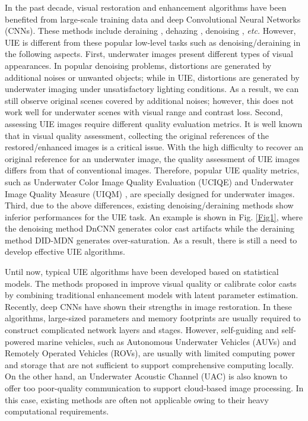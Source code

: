 \documentclass[journal]{IEEEtran}
\begin{document}
In the past decade, visual restoration and enhancement algorithms have been benefited from large-scale training data and deep Convolutional Neural Networks (CNNs). These methods include deraining \cite{DID-MDN,zhang2019image,wang2020deep}, dehazing \cite{dehazeli2018single,liuICCV2019GridDehazeNet,yang2019single}, denoising \cite{zhang2017beyond}, \textit{etc.} 
However, UIE is different from these popular low-level tasks such as denoising/deraining in the following aspects. First, underwater images present different types of visual appearances. In popular denoising problems, distortions are generated by additional noises or unwanted objects; while in UIE, distortions are generated by underwater imaging under unsatisfactory lighting conditions. As a result, we can still observe original scenes covered by additional noises; however, this does not work well for underwater scenes with visual range and contrast loss. Second, assessing UIE images require different quality evaluation metrics. It is well known that in visual quality assessment, collecting the original references of the restored/enhanced images is a critical issue. With the high difficulty to recover an original reference for an underwater image, the quality assessment of UIE images differs from that of conventional images. Therefore, popular UIE quality metrics, such as Underwater Color Image Quality Evaluation (UCIQE) \cite{yang2015underwater} and Underwater Image Quality Measure (UIQM) \cite{panetta2015human}, are specially designed for underwater images. Third, due to the above differences, existing denoising/deraining methods show inferior performances for the UIE task. An example is shown in Fig. \ref{Fig1}, where the denoising method DnCNN \cite{zhang2017beyond} generates color cast artifacts while the deraining method DID-MDN \cite{DID-MDN} generates over-saturation. As a result, there is still a need to develop effective UIE algorithms.

Until now, typical UIE algorithms have been developed based on statistical models. The methods proposed in \cite{carlevaris2010initial,chiang2011underwater,Wen2013Single} improve visual quality or calibrate color casts by combining traditional enhancement models with latent parameter estimation. Recently, deep CNNs have shown their strengths in image restoration. In these algorithms, large-sized parameters and memory footprints are usually required to construct complicated network layers and stages. However, self-guiding and self-powered marine vehicles, such as Autonomous Underwater Vehicles (AUVs) and Remotely Operated Vehicles (ROVs), are usually with limited computing power and storage that are not sufficient to support comprehensive computing locally. On the other hand, an Underwater Acoustic Channel (UAC) is also known to offer too poor-quality communication to support cloud-based image processing. In this case, existing methods are often not applicable owing to their heavy computational requirements. 
\end{document}
